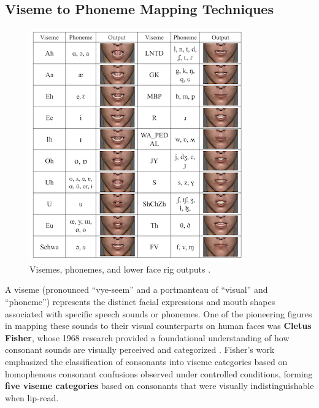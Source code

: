 \documentclass[12pt]{article}
\begin{document}
\subsection{Viseme to Phoneme Mapping Techniques}


\begin{figure}
\centering
\vspace{-5mm}
\includegraphics[width=\linewidth]{visemenet.png}
\caption{Visemes, phonemes, and lower face rig outputs \cite{Zhou2018visemenet}.}
\label{fig:viseme-mapping}
\end{figure}
A viseme (pronounced “vye-seem” and a portmanteau of “visual” and “phoneme”) represents the distinct facial expressions and mouth shapes associated with specific speech sounds or phonemes. One of the pioneering figures in mapping these sounds to their visual counterparts on human faces was \textbf{Cletus Fisher}, whose 1968 research provided a foundational understanding of how consonant sounds are visually perceived and categorized \cite{Fisher1968ConfusionsConsonants.}. Fisher’s work emphasized the classification of consonants into viseme categories based on homophenous consonant confusions observed under controlled conditions, forming \textbf{five viseme categories} based on consonants that were visually indistinguishable when lip-read.
\end{document}
